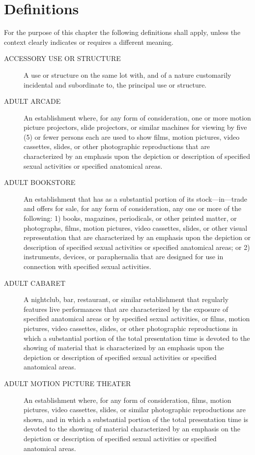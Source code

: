 \section{Definitions}
For the purpose of this chapter the following definitions shall apply, unless the context clearly indicates or requires a different meaning.
\begin{description}
    \item[ACCESSORY USE OR STRUCTURE] A use or structure on the same lot with, and of a nature customarily incidental and subordinate to, the principal use or structure.
    \item[ADULT ARCADE] An establishment where, for any form of consideration, one or more motion picture projectors, slide projectors, or similar machines for viewing by five (5) or fewer persons each are used to show films, motion pictures, video cassettes, slides, or other photographic reproductions that are characterized by an emphasis upon the depiction or description of specified sexual activities or specified anatomical areas.
    \item[ADULT BOOKSTORE] An establishment that has as a substantial portion of its stock—in—trade and offers for sale, for any form of consideration, any one or more of the following: 1) books, magazines, periodicals, or other printed matter, or photographs, films, motion pictures, video cassettes, slides, or other visual representation that are characterized by an emphasis upon the depiction or description of specified sexual activities or specified anatomical areas; or 2) instruments, devices, or paraphernalia that are designed for use in connection with specified sexual activities.
    \item[ADULT CABARET] A nightclub, bar, restaurant, or similar establishment that regularly features live performances that are characterized by the exposure of specified anatomical areas or by specified sexual activities, or films, motion pictures, video cassettes, slides, or other photographic reproductions in which a substantial portion of the total presentation time is devoted to the showing of material that is characterized by an emphasis upon the depiction or description of specified sexual activities or specified anatomical areas.
    \item[ADULT MOTION PICTURE THEATER] An establishment where, for any form of consideration, films, motion pictures, video cassettes, slides, or similar photographic reproductions are shown, and in which a substantial portion of the total presentation time is devoted to the showing of material characterized by an emphasis on the depiction or description of specified sexual activities or specified anatomical areas.

\end{description}
